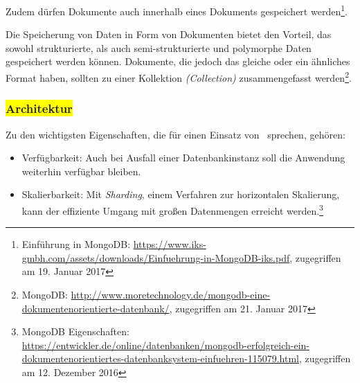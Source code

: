Zudem dürfen Dokumente auch innerhalb eines Dokuments gespeichert werden\footnote{Einführung in MongoDB: \url{https://www.iks-gmbh.com/assets/downloads/Einfuehrung-in-MongoDB-iks.pdf}, zugegriffen am 19. Januar 2017}. 

Die Speicherung von Daten in Form von Dokumenten bietet den Vorteil, das sowohl strukturierte, als auch semi-strukturierte und polymorphe Daten gespeichert werden können. Dokumente, die jedoch das gleiche oder ein ähnliches Format haben, sollten zu einer Kollektion \textit{(Collection)} zusammengefasst werden\footnote{MongoDB: \url{http://www.moretechnology.de/mongodb-eine-dokumentenorientierte-datenbank/}, zugegriffen am 21. Januar 2017}.

\subsubsection{\colorbox{yellow}{Architektur}}

Zu den wichtigsten Eigenschaften, die für einen Einsatz von \mongo\ sprechen, gehören:
\begin{itemize}
\item Verfügbarkeit: Auch bei Ausfall einer Datenbankinstanz soll die Anwendung weiterhin verfügbar bleiben.
\item Skalierbarkeit: Mit \textit{Sharding}, einem Verfahren zur horizontalen Skalierung, kann der effiziente Umgang mit großen Datenmengen erreicht werden.\footnote{MongoDB Eigenschaften: \url{https://entwickler.de/online/datenbanken/mongodb-erfolgreich-ein-dokumentenorientiertes-datenbanksystem-einfuehren-115079.html}, zugegriffen am 12. Dezember 2016}
\end{itemize}



